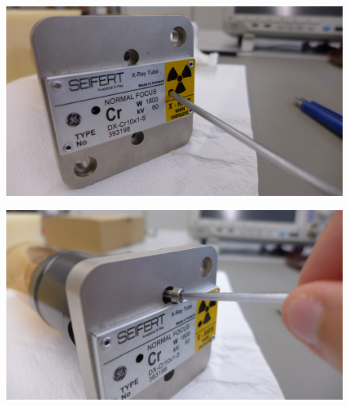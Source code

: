 \documentclass[a4paper,12pt,twoside]{article}
\begin{document}
\begin{appendices}
\begin{figure} [h!]
\centering
\begin{minipage}{.48\textwidth}
  \centering
  \includegraphics[width=\textwidth]{./Figures/screws1.png}
  \label{screws1}
\end{minipage}%
\hspace{2mm}
\begin{minipage}{.48\textwidth}
  \centering
  \includegraphics[width=\textwidth]{./Figures/screws2.png}
  \label{screws2}
\end{minipage}
\end{figure}


\end{appendices}
\end{document}
